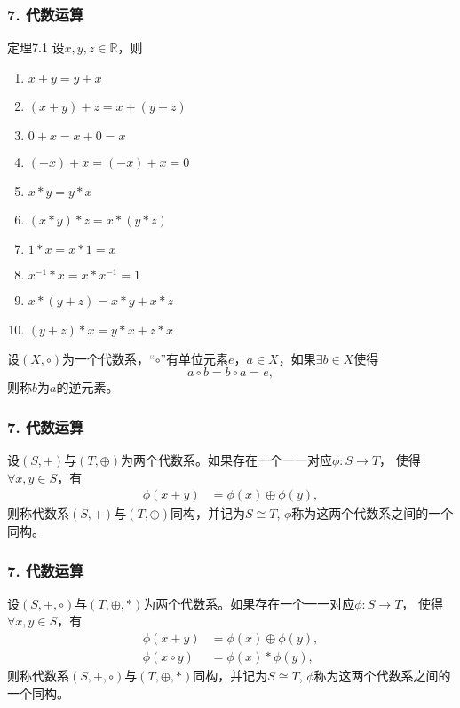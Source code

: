\documentclass{beamer}
\begin{document}
\begin{CJK*}{UTF8}{gbsn}
\begin{frame}
  \frametitle{7. 代数运算}
  \begin{minipage}[t]{0.49\linewidth}
  \begin{block}{定理7.1}
    设$x, y, z \in \mathbb{R}$，则
   \begin{enumerate}
   \item   $x + y = y + x$
   \item   $(x + y) + z = x + (y + z)$
   \item   $0 + x = x + 0 = x$
   \item   $(-x) + x = (-x) + x = 0$
   \item   $x * y = y * x$
   \item   $(x * y) * z = x * (y *z)$
   \item   $1 * x = x * 1 = x$
   \item   $x^{-1} * x = x * x^{-1} = 1$
   \item   $x* (y + z) = x * y + x * z$
   \item   $(y + z) * x = y * x + z * x$
    \end{enumerate}
  \end{block}\pause
\end{minipage}
\begin{minipage}[t]{0.49\linewidth}
  \begin{Def}
    设$(X, \circ)$为一个代数系，“$\circ$”有单位元素$e$，$a\in X$，如果$\exists b\in X$使得\[a\circ b = b \circ a = e,\]  则称$b$为$a$的\alert{逆元素}。
  \end{Def}
\end{minipage}
\end{frame}

\begin{frame}
  \frametitle{7. 代数运算}
  \begin{Def}
    设$(S,+)$与$(T, \oplus)$为两个代数系。如果存在一个一一对应$\phi:S\to T$， 使得$\forall x, y \in S$，有
    \begin{align*}
      \phi(x+y) &= \phi(x) \oplus \phi(y),
    \end{align*}
    则称代数系$(S,+)$与$(T, \oplus)$\alert{同构}，并记为$S\cong T$, $\phi$称为这两个代数系之间的一个同构。
  \end{Def}
\end{frame}

\begin{frame}
  \frametitle{7. 代数运算}
  \begin{Def}
    设$(S,+, \circ)$与$(T, \oplus, *)$为两个代数系。如果存在一个一一对应$\phi:S\to T$， 使得$\forall x, y \in S$，有
    \begin{align*}
      \phi(x+y) &= \phi(x) \oplus \phi(y),\\
      \phi(x\circ y)&= \phi(x) * \phi(y),
    \end{align*}
    则称代数系$(S,+,\circ)$与$(T, \oplus, *)$\alert{同构}，并记为$S\cong T$, $\phi$称为这两个代数系之间的一个同构。
  \end{Def}
\end{frame}


\end{CJK*}
\end{document}
